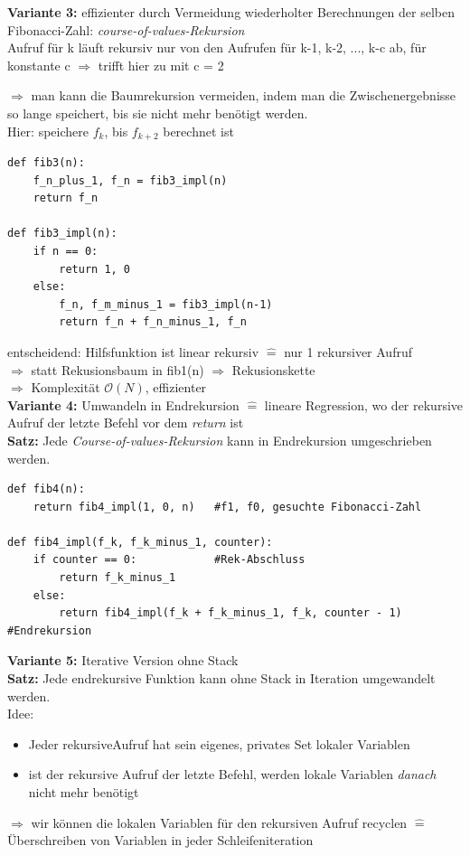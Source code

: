 \documentclass[11pt, fleqn]{scrreprt}
\newcommand{\bigO}[0]{\mathcal{O}}
\begin{document}
\textbf{Variante 3:} effizienter durch Vermeidung wiederholter Berechnungen der selben Fibonacci-Zahl: \emph{course-of-values-Rekursion} \\

Aufruf für k läuft rekursiv nur von den Aufrufen für k-1, k-2, ..., k-c ab, für konstante c $\Rightarrow$ trifft hier zu mit c = 2

$\Rightarrow$ man kann die Baumrekursion vermeiden, indem man die Zwischenergebnisse so lange speichert, bis sie nicht mehr benötigt werden. \\

Hier: speichere $f_k$, bis $f_{k+2}$ berechnet ist
\begin{verbatim}
def fib3(n):
    f_n_plus_1, f_n = fib3_impl(n)
    return f_n

def fib3_impl(n):
    if n == 0:
        return 1, 0
    else:
        f_n, f_m_minus_1 = fib3_impl(n-1)
        return f_n + f_n_minus_1, f_n
\end{verbatim}
entscheidend: Hilfsfunktion ist linear rekursiv $\widehat{=}$ nur 1 rekursiver Aufruf \\
$\Rightarrow$ statt Rekusionsbaum in fib1(n) $\Rightarrow$ Rekusionskette\\
$\Rightarrow$ Komplexität $\bigO{}(N)$, effizienter\\

\textbf{Variante 4:} Umwandeln in Endrekursion $\widehat{=}$ lineare Regression, wo der rekursive Aufruf der letzte Befehl vor dem \emph{return} ist \\

\textbf{Satz:} Jede \emph{Course-of-values-Rekursion} kann in Endrekursion umgeschrieben werden.

\begin{verbatim}
def fib4(n):
    return fib4_impl(1, 0, n)   #f1, f0, gesuchte Fibonacci-Zahl

def fib4_impl(f_k, f_k_minus_1, counter):
    if counter == 0:            #Rek-Abschluss
        return f_k_minus_1
    else:
        return fib4_impl(f_k + f_k_minus_1, f_k, counter - 1)   #Endrekursion
\end{verbatim}

\textbf{Variante 5: }Iterative Version ohne Stack\\

\textbf{Satz:} Jede endrekursive Funktion kann ohne Stack in Iteration umgewandelt werden. \\
Idee:
\begin{itemize}
    \item Jeder rekursiveAufruf hat sein eigenes, privates Set lokaler Variablen
    \item ist der rekursive Aufruf der letzte Befehl, werden lokale Variablen \emph{danach} nicht mehr benötigt
\end{itemize}
$\Rightarrow$ wir können die lokalen Variablen für den rekursiven Aufruf recyclen $\widehat{=}$ Überschreiben von Variablen in jeder Schleifeniteration \\
\end{document}
